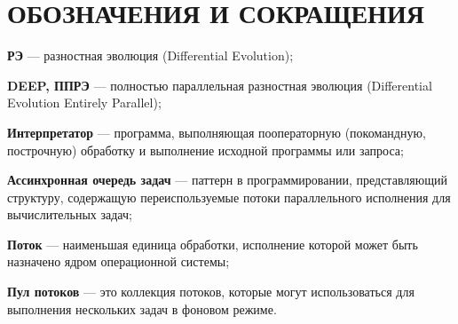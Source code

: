 \chapter*{ОБОЗНАЧЕНИЯ И СОКРАЩЕНИЯ}

\textbf{РЭ} ---
разностная эволюция (Differential Evolution);

\textbf{DEEP, ППРЭ} ---
полностью параллельная разностная эволюция
(Differential Evolution Entirely Parallel);

\textbf{Интерпретатор} ---
программа, выполняющая пооператорную
(покомандную, построчную) обработку
и выполнение исходной программы или запроса;

\textbf{Ассинхронная очередь задач} --- 
паттерн в программировании,
представляющий структуру,
содержащую переиспользуемые
потоки параллельного исполнения
для вычислительных задач;

\textbf{Поток} ---
наименьшая единица обработки,
исполнение которой может быть назначено
ядром операционной системы;

\textbf{Пул потоков} ---
это коллекция потоков,
которые могут использоваться
для выполнения нескольких задач
в фоновом режиме.
